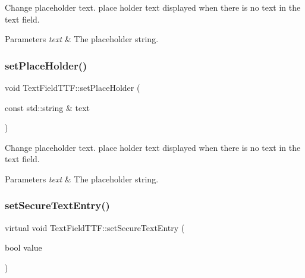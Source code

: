 Change placeholder text. place holder text displayed when there is no text in the text field. 
\begin{DoxyParams}{Parameters}
{\em text} & The placeholder string. \\
\hline
\end{DoxyParams}
\mbox{\label{classTextFieldTTF_a2d580797c1d8d72272228a042c8215f1}} 
\subsubsection{\texorpdfstring{set\+Place\+Holder()}{setPlaceHolder()}\hspace{0.1cm}{\footnotesize\ttfamily [2/2]}}
{\footnotesize\ttfamily void Text\+Field\+T\+T\+F\+::set\+Place\+Holder (\begin{DoxyParamCaption}\item[{const std\+::string \&}]{text }\end{DoxyParamCaption})\hspace{0.3cm}{\ttfamily [virtual]}}

Change placeholder text. place holder text displayed when there is no text in the text field. 
\begin{DoxyParams}{Parameters}
{\em text} & The placeholder string. \\
\hline
\end{DoxyParams}
\mbox{\label{classTextFieldTTF_aa2519e02bd0178cc680252dd9cca3b79}} 
\subsubsection{\texorpdfstring{set\+Secure\+Text\+Entry()}{setSecureTextEntry()}\hspace{0.1cm}{\footnotesize\ttfamily [1/2]}}
{\footnotesize\ttfamily virtual void Text\+Field\+T\+T\+F\+::set\+Secure\+Text\+Entry (\begin{DoxyParamCaption}\item[{bool}]{value }\end{DoxyParamCaption})\hspace{0.3cm}{\ttfamily [virtual]}}

